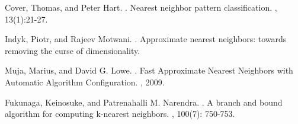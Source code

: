 \documentclass[11pt,letterpaper]{article}
\begin{document}
\begin{thebibliography}{}
 Cover, Thomas, and Peter Hart.
.
\newblock Nearest neighbor pattern classification.
, 13(1):21-27.

 Indyk, Piotr, and Rajeev Motwani.
.
\newblock Approximate nearest neighbors: towards removing the curse of dimensionality.

 Muja, Marius, and David G. Lowe.
.
\newblock Fast Approximate Nearest Neighbors with Automatic Algorithm Configuration.
, 2009.

 Fukunaga, Keinosuke, and Patrenahalli M. Narendra.
.
\newblock A branch and bound algorithm for computing k-nearest neighbors.
, 100(7): 750-753.
\end{thebibliography}
\end{document}
